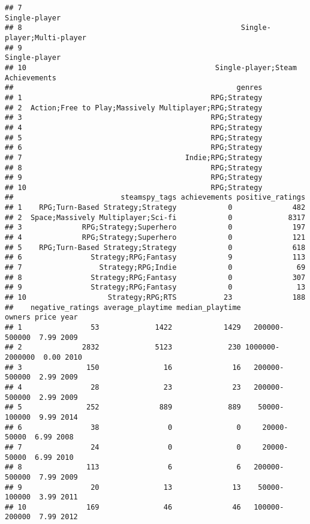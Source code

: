 \documentclass[
]{article}
\begin{document}
\begin{verbatim}
## 7                                                                Single-player
## 8                                                   Single-player;Multi-player
## 9                                                                Single-player
## 10                                            Single-player;Steam Achievements
##                                                    genres
## 1                                            RPG;Strategy
## 2  Action;Free to Play;Massively Multiplayer;RPG;Strategy
## 3                                            RPG;Strategy
## 4                                            RPG;Strategy
## 5                                            RPG;Strategy
## 6                                            RPG;Strategy
## 7                                      Indie;RPG;Strategy
## 8                                            RPG;Strategy
## 9                                            RPG;Strategy
## 10                                           RPG;Strategy
##                         steamspy_tags achievements positive_ratings
## 1    RPG;Turn-Based Strategy;Strategy            0              482
## 2  Space;Massively Multiplayer;Sci-fi            0             8317
## 3              RPG;Strategy;Superhero            0              197
## 4              RPG;Strategy;Superhero            0              121
## 5    RPG;Turn-Based Strategy;Strategy            0              618
## 6                Strategy;RPG;Fantasy            9              113
## 7                  Strategy;RPG;Indie            0               69
## 8                Strategy;RPG;Fantasy            0              307
## 9                Strategy;RPG;Fantasy            0               13
## 10                   Strategy;RPG;RTS           23              188
##    negative_ratings average_playtime median_playtime          owners price year
## 1                53             1422            1429   200000-500000  7.99 2009
## 2              2832             5123             230 1000000-2000000  0.00 2010
## 3               150               16              16   200000-500000  2.99 2009
## 4                28               23              23   200000-500000  2.99 2009
## 5               252              889             889    50000-100000  9.99 2014
## 6                38                0               0     20000-50000  6.99 2008
## 7                24                0               0     20000-50000  6.99 2010
## 8               113                6               6   200000-500000  7.99 2009
## 9                20               13              13    50000-100000  3.99 2011
## 10              169               46              46   100000-200000  7.99 2012
\end{verbatim}
\end{document}
